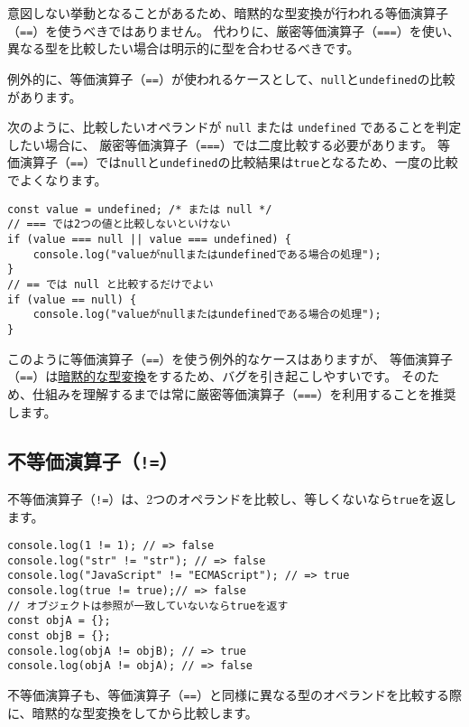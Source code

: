 意図しない挙動となることがあるため、暗黙的な型変換が行われる等価演算子（\texttt{==}）を使うべきではありません。
代わりに、厳密等価演算子（\texttt{===}）を使い、異なる型を比較したい場合は明示的に型を合わせるべきです。

例外的に、等価演算子（\texttt{==}）が使われるケースとして、\texttt{null}と\texttt{undefined}の比較があります。

次のように、比較したいオペランドが \texttt{null} または
\texttt{undefined} であることを判定したい場合に、
厳密等価演算子（\texttt{===}）では二度比較する必要があります。
等価演算子（\texttt{==}）では\texttt{null}と\texttt{undefined}の比較結果は\texttt{true}となるため、一度の比較でよくなります。

\begin{lstlisting}
const value = undefined; /* または null */
// === では2つの値と比較しないといけない
if (value === null || value === undefined) {
    console.log("valueがnullまたはundefinedである場合の処理");
}
// == では null と比較するだけでよい
if (value == null) {
    console.log("valueがnullまたはundefinedである場合の処理");
}
\end{lstlisting}

このように等価演算子（\texttt{==}）を使う例外的なケースはありますが、
等価演算子（\texttt{==}）は\hyperlink{implicit-coercion}{暗黙的な型変換}をするため、バグを引き起こしやすいです。
そのため、仕組みを理解するまでは常に厳密等価演算子（\texttt{===}）を利用することを推奨します。

\hypertarget{not-equal-operator}{%
\subsection{\texorpdfstring{不等価演算子（\texttt{!=}）}{不等価演算子（!=）}}\label{not-equal-operator}}

不等価演算子（\texttt{!=}）は、2つのオペランドを比較し、等しくないなら\texttt{true}を返します。

\begin{lstlisting}
console.log(1 != 1); // => false
console.log("str" != "str"); // => false
console.log("JavaScript" != "ECMAScript"); // => true
console.log(true != true);// => false
// オブジェクトは参照が一致していないならtrueを返す
const objA = {};
const objB = {};
console.log(objA != objB); // => true
console.log(objA != objA); // => false
\end{lstlisting}

不等価演算子も、等価演算子（\texttt{==}）と同様に異なる型のオペランドを比較する際に、暗黙的な型変換をしてから比較します。


